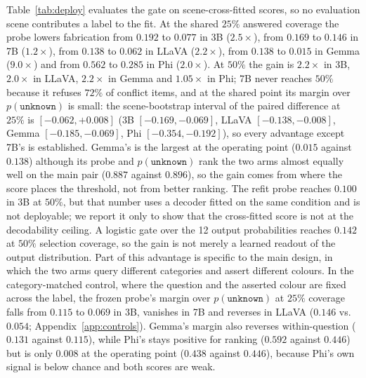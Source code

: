 \documentclass[10pt]{article}
\newcommand{\unknown}{\texttt{unknown}}
\newcommand{\punk}{p(\unknown)}
\begin{document}
Table~\ref{tab:deploy} evaluates the gate on scene-cross-fitted scores, so no evaluation scene contributes a label to the fit. At the shared $25\%$ answered coverage the probe lowers fabrication from $0.192$ to $0.077$ in 3B ($2.5\times$), from $0.169$ to $0.146$ in 7B ($1.2\times$), from $0.138$ to $0.062$ in LLaVA ($2.2\times$), from $0.138$ to $0.015$ in Gemma ($9.0\times$) and from $0.562$ to $0.285$ in Phi ($2.0\times$). At $50\%$ the gain is $2.2\times$ in 3B, $2.0\times$ in LLaVA, $2.2\times$ in Gemma and $1.05\times$ in Phi; 7B never reaches $50\%$ because it refuses $72\%$ of conflict items, and at the shared point its margin over $\punk$ is small: the scene-bootstrap interval of the paired difference at $25\%$ is $[-0.062,+0.008]$ (3B $[-0.169,-0.069]$, LLaVA $[-0.138,-0.008]$, Gemma $[-0.185,-0.069]$, Phi $[-0.354,-0.192]$), so every advantage except 7B's is established. Gemma's is the largest at the operating point ($0.015$ against $0.138$) although its probe and $\punk$ rank the two arms almost equally well on the main pair ($0.887$ against $0.896$), so the gain comes from where the score places the threshold, not from better ranking. The refit probe reaches $0.100$ in 3B at $50\%$, but that number uses a decoder fitted on the same condition and is not deployable; we report it only to show that the cross-fitted score is not at the decodability ceiling. A logistic gate over the 12 output probabilities reaches $0.142$ at $50\%$ selection coverage, so the gain is not merely a learned readout of the output distribution. Part of this advantage is specific to the main design, in which the two arms query different categories and assert different colours. In the category-matched control, where the question and the asserted colour are fixed across the label, the frozen probe's margin over $\punk$ at $25\%$ coverage falls from $0.115$ to $0.069$ in 3B, vanishes in 7B and reverses in LLaVA ($0.146$ vs.\ $0.054$; Appendix~\ref{app:controls}). Gemma's margin also reverses within-question ($0.131$ against $0.115$), while Phi's stays positive for ranking ($0.592$ against $0.446$) but is only $0.008$ at the operating point ($0.438$ against $0.446$), because Phi's own signal is below chance and both scores are weak.
\end{document}
